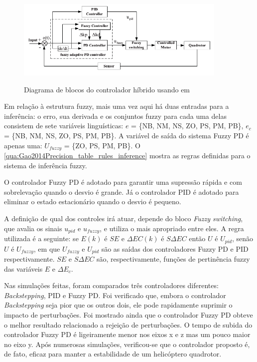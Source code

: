 \begin{figure}[!htb]
    \centering
    \caption{Diagrama de blocos do controlador híbrido usando em \cite{Gao2014Precision}}
    \includegraphics[width=0.9\textwidth]{./04-figuras/Gao2014Precision_block_diagram}
    \label{fig:Gao2014Precision_block_diagram}
\end{figure}

Em relação à estrutura fuzzy, mais uma vez aqui há duas entradas para a inferência: o erro, sua derivada e os conjuntos fuzzy para cada uma delas consistem de sete variáveis linguísticas: $e$ = \{NB, NM, NS, ZO, PS, PM, PB\}, $e_c$ = \{NB, NM, NS, ZO, PS, PM, PB\}. A variável de saída do sistema Fuzzy PD é apenas uma: $U_{fuzzy}$ = \{ZO, PS, PM, PB\}. O \autoref{qua:Gao2014Precision_table_rules_inference} mostra as regras definidas para o sistema de inferência fuzzy.



O controlador Fuzzy PD é adotado para garantir uma supressão rápida e com sobrelevação quando o desvio é grande. Já o controlador PID é adotado para eliminar o estado estacionário quando o desvio é pequeno.

A definição de qual dos controles irá atuar, depende do bloco \textit{Fuzzy switching}, que avalia os sinais $u_{pid}$ e $u_{fuzzy}$, e utiliza o mais apropriado entre eles. A regra utilizada é a seguinte: se $E(k)$ é $SE$ e $\Delta EC(k)$ é $S\Delta EC$ então $U$ é $U_{pid}$, senão $U$ é $U_{fuzzy}$, em que $U_{fuzzy}$ e $U_{pid}$ são as saídas dos controladores Fuzzy PD e PID respectivamente. $SE$ e $S\Delta EC$ são, respectivamente, funções de pertinência fuzzy das variáveis $E$ e $\Delta E_c$.

Nas simulações feitas, foram comparados três controladores diferentes: \textit{Backstepping}, PID e Fuzzy PD. Foi verificado que, embora o controlador \textit{Backstepping} seja pior que os outros dois, ele pode rapidamente suprimir o impacto de perturbações. Foi mostrado ainda que o controlador Fuzzy PD obteve o melhor resultado relacionado a rejeição de perturbações. O tempo de subida do controlador Fuzzy PD é ligeiramente menor nos eixos x e z mas um pouco maior no eixo y. Após numerosas simulações, verificou-se que o controlador proposto é, de fato, eficaz para manter a estabilidade de um helicóptero quadrotor.

